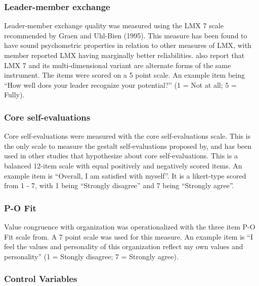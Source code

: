 \subsubsection{Leader-member exchange}\label{leader-member-exchange-1}

Leader-member exchange quality was measured using the LMX 7 scale
recommended by Graen and Uhl-Bien (1995). This measure has been found to
have sound psychometric properties in relation to other measures of LMX,
with member reported LMX having marginally better reliabilities. also
report that LMX 7 and its multi-dimensional variant are alternate forms
of the same instrument. The items were scored on a 5 point scale. An
example item being ``How well does your leader recognize your
potential?'' (1 = Not at all; 5 = Fully).

\subsubsection{Core self-evaluations}\label{core-self-evaluations-1}

Core self-evaluations were measured with the core self-evaluations
scale. This is the only scale to measure the gestalt self-evaluations
proposed by, and has been used in other studies that hypothesize about
core self-evaluations. This is a balanced 12-item scale with equal
positively and negatively scored items. An example item is ``Overall, I
am satisfied with myself''. It is a likert-type scored from 1 - 7, with
1 being ``Strongly disagree'' and 7 being ``Strongly agree''.

\subsubsection{P-O Fit}\label{p-o-fit-1}

Value congruence with organization was operationalized with the three
item P-O Fit scale from. A 7 point scale was used for this measure. An
example item is ``I feel the values and personality of this organization
reflect my own values and personality'' (1 = Stongly disagree; 7 =
Strongly agree).

\subsubsection{Control Variables}\label{control-variables}


